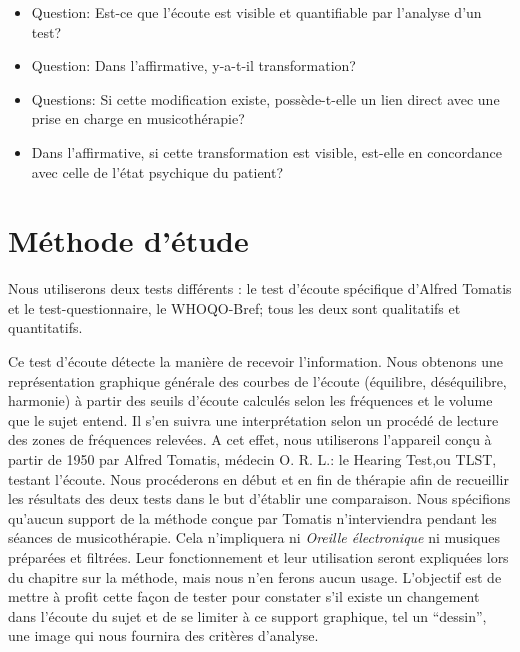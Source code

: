  
 \begin{itemize}
 \item  Question:
   Est-ce que l'écoute est visible et quantifiable par
          l'analyse d'un test?
 
 \end{itemize}
 	
 \begin{itemize}
 \item Question:
   Dans l'affirmative, y-a-t-il transformation?
   
\end{itemize}
 
\begin{itemize}
          
 \item Questions:
   Si cette modification existe, possède-t-elle un lien direct avec une prise en charge
  en musicothérapie?
  
  \item Dans l'affirmative, 
   si cette transformation est visible, est-elle en 
 	concordance 
 	avec celle de l'état psychique du patient?
        
 \end{itemize}

 






 

\section{Méthode d'étude}

	Nous utiliserons deux tests différents : 
	le test d'écoute spécifique d'Alfred Tomatis
	et le test-questionnaire, le WHOQO-Bref; tous les deux sont
        qualitatifs et quantitatifs.

        
        Ce test d'écoute détecte la manière de recevoir
        l'information. Nous obtenons une  
	représentation graphique générale des courbes de l'écoute
        (équilibre, déséquilibre, harmonie) à partir des seuils d'écoute
        calculés selon les fréquences et le volume que le sujet entend. Il s'en suivra une interprétation
        selon un procédé de lecture des zones de fréquences relevées.
	A cet effet, nous utiliserons l'appareil conçu à partir de 1950 par Alfred Tomatis, médecin
        O. R. L.: le Hearing Test,ou TLST, testant
        l'écoute.
	Nous procéderons en début et en fin de thérapie
        afin de recueillir les résultats des
        deux tests dans le but d'établir une comparaison.
        Nous spécifions qu'aucun support de la méthode conçue par
        Tomatis n'interviendra pendant les séances de musicothérapie.
        Cela n'impliquera ni 
\textsl{Oreille
	électronique} ni musiques préparées et filtrées. Leur
      fonctionnement et leur utilisation seront expliquées lors du
      chapitre sur la méthode, mais nous n'en ferons aucun
      usage. L'objectif est de mettre à profit cette façon de  tester pour constater
      s'il existe un changement dans l'écoute du sujet et de
      se limiter à ce support graphique, tel un ``dessin'',
      une image qui nous fournira des critères d'analyse.
       
